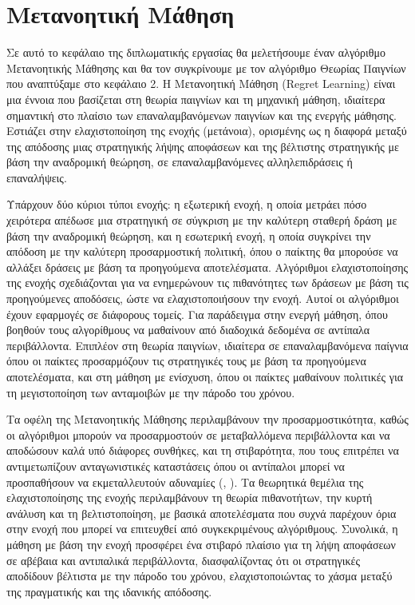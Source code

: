 \chapter{Μετανοητική Μάθηση}

Σε αυτό το κεφάλαιο της διπλωματικής εργασίας θα μελετήσουμε έναν αλγόριθμο Μετανοητικής Μάθησης και θα τον συγκρίνουμε με τον αλγόριθμο Θεωρίας Παιγνίων που αναπτύξαμε στο κεφάλαιο 2. Η Μετανοητική Μάθηση (Regret Learning) είναι μια έννοια που βασίζεται στη θεωρία παιγνίων και τη μηχανική μάθηση, ιδιαίτερα σημαντική στο πλαίσιο των επαναλαμβανόμενων παιγνίων και της ενεργής μάθησης. Εστιάζει στην ελαχιστοποίηση της ενοχής (μετάνοια), ορισμένης ως η διαφορά μεταξύ της απόδοσης μιας στρατηγικής λήψης αποφάσεων και της βέλτιστης στρατηγικής με βάση την αναδρομική θεώρηση, σε επαναλαμβανόμενες αλληλεπιδράσεις ή επαναλήψεις. 

Υπάρχουν δύο κύριοι τύποι ενοχής: η εξωτερική ενοχή, η οποία μετράει πόσο χειρότερα απέδωσε μια στρατηγική σε σύγκριση με την καλύτερη σταθερή δράση με βάση την αναδρομική θεώρηση, και η εσωτερική ενοχή, η οποία συγκρίνει την απόδοση με την καλύτερη προσαρμοστική πολιτική, όπου ο παίκτης θα μπορούσε να αλλάξει δράσεις με βάση τα προηγούμενα αποτελέσματα. Αλγόριθμοι ελαχιστοποίησης της ενοχής σχεδιάζονται για να ενημερώνουν τις πιθανότητες των δράσεων με βάση τις προηγούμενες αποδόσεις, ώστε να ελαχιστοποιήσουν την ενοχή. Αυτοί οι αλγόριθμοι έχουν εφαρμογές σε διάφορους τομείς. Για παράδειγμα στην ενεργή μάθηση, όπου βοηθούν τους αλγορίθμους να μαθαίνουν από διαδοχικά δεδομένα σε αντίπαλα περιβάλλοντα. Επιπλέον στη θεωρία παιγνίων, ιδιαίτερα σε επαναλαμβανόμενα παίγνια όπου οι παίκτες προσαρμόζουν τις στρατηγικές τους με βάση τα προηγούμενα αποτελέσματα, και στη μάθηση με ενίσχυση, όπου οι παίκτες μαθαίνουν πολιτικές για τη μεγιστοποίηση των ανταμοιβών με την πάροδο του χρόνου. 

Τα οφέλη της Μετανοητικής Μάθησης περιλαμβάνουν την προσαρμοστικότητα, καθώς οι αλγόριθμοι μπορούν να προσαρμοστούν σε μεταβαλλόμενα περιβάλλοντα και να αποδώσουν καλά υπό διάφορες συνθήκες, και τη στιβαρότητα, που τους επιτρέπει να αντιμετωπίζουν ανταγωνιστικές καταστάσεις όπου οι αντίπαλοι μπορεί να προσπαθήσουν να εκμεταλλευτούν αδυναμίες (, ). Τα θεωρητικά θεμέλια της ελαχιστοποίησης της ενοχής περιλαμβάνουν τη θεωρία πιθανοτήτων, την κυρτή ανάλυση και τη βελτιστοποίηση, με βασικά αποτελέσματα που συχνά παρέχουν όρια στην ενοχή που μπορεί να επιτευχθεί από συγκεκριμένους αλγόριθμους. Συνολικά, η μάθηση με βάση την ενοχή προσφέρει ένα στιβαρό πλαίσιο για τη λήψη αποφάσεων σε αβέβαια και αντιπαλικά περιβάλλοντα, διασφαλίζοντας ότι οι στρατηγικές αποδίδουν βέλτιστα με την πάροδο του χρόνου, ελαχιστοποιώντας το χάσμα μεταξύ της πραγματικής και της ιδανικής απόδοσης.

